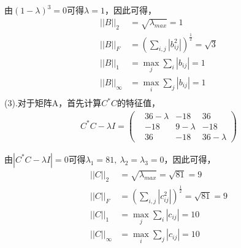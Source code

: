 \documentclass[UTF8,12pt, a4paper]{ctexart}
\begin{document}
  由$(1-\lambda)^3=0$可得$\lambda=1$，因此可得，
  $$
  \begin{aligned}
    ||B||_2 &= \sqrt{\lambda_{max}} = 1 \\
    ||B||_F &= \left(\sum_{i,j}{|b_{ij}^2|}\right)^{\frac{1}{2}} = \sqrt{3}\\
    ||B||_1 &= \mathop{max} \limits_{j}\sum_{i}{|b_{ij}|} = 1 \\
    ||B||_{\infty} &= \mathop{max} \limits_{i}\sum_{j}{|b_{ij}|} = 1 \\
  \end{aligned}
  $$
  (3).对于矩阵A，首先计算$C^*C$的特征值，
  $$
  \begin{aligned}
    C^*C-\lambda I = 
    \left(
      \begin{matrix}
        &36-\lambda &-18 &36 \\
        &-18 &9-\lambda &-18 \\
        &36 &-18 &36-\lambda
      \end{matrix}
    \right)
  \end{aligned}
  $$

  由$|C^*C-\lambda I| = 0$可得$\lambda _1=81,\ \lambda_2=\lambda_3 = 0$，因此可得，
  $$
  \begin{aligned}
    ||C||_2 &= \sqrt{\lambda_{max}} = \sqrt{81} = 9 \\
    ||C||_F &= \left(\sum_{i,j}{|c_{ij}^2|}\right)^{\frac{1}{2}} = \sqrt{81}=9\\
    ||C||_1 &= \mathop{max} \limits_{j}\sum_{i}{|c_{ij}|} = 10 \\
    ||C||_{\infty} &= \mathop{max} \limits_{i}\sum_{j}{|c_{ij}|} = 10 \\
  \end{aligned}
  $$
  
\end{document}
